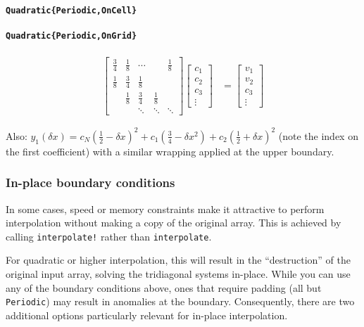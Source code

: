 \documentclass{article}
\begin{document}
\paragraph{\texttt{Quadratic\{Periodic,OnCell\}}}
\paragraph{\texttt{Quadratic\{Periodic,OnGrid\}}}
\begin{align*}
\begin{bmatrix}
\frac{3}{4} & \frac{1}{8} & \cdots & & \frac{1}{8}\\
\frac{1}{8} & \frac{3}{4} & \frac{1}{8} \\
 & \frac{1}{8} & \frac{3}{4} & \frac{1}{8} \\
 & & \ddots & \ddots & \ddots
\end{bmatrix}
\begin{bmatrix}c_1\\ c_2\\ c_3\\\vdots\end{bmatrix}
&=
\begin{bmatrix}v_1 \\ v_2 \\ c_3\\\vdots\end{bmatrix}
\end{align*}

Also: $y_1(\delta x) = c_N (\frac{1}{2} - \delta x)^2 + c_1 (\frac{3}{4} - \delta x^2) + c_2(\frac{1}{2} + \delta x)^2$ (note the index on the first coefficient) with a similar wrapping applied at the upper boundary.

\subsubsection{In-place boundary conditions}

In some cases, speed or memory constraints make it attractive to
perform interpolation without making a copy of the original array.
This is achieved by calling \texttt{interpolate!} rather than
\texttt{interpolate}.

For quadratic or higher interpolation, this will result in the
``destruction'' of the original input array, solving the tridiagonal
systems in-place.  While you can use any of the boundary conditions
above, ones that require padding (all but \texttt{Periodic}) may
result in anomalies at the boundary.  Consequently, there are two
additional options particularly relevant for in-place interpolation.
\end{document}
